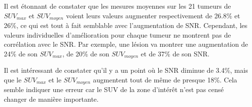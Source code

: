 Il est étonnant de constater que les mesures moyennes sur les 21 tumeurs de $SUV_{max}$ et $SUV_{moyen}$ voient leurs valeurs augmenter respectivement de 26.8\% et 26\%, ce qui est tout à fait semblable avec l'augmentation de SNR. Cependant, les valeurs individuelles d'amélioration  pour chaque tumeur ne montrent pas de corrélation avec le SNR. Par exemple, une lésion va montrer une augmentation de 24\% de son $SUV_{max}$, de 20\% de son $SUV_{moyen}$ et de 37\% de son SNR.

Il est intéressant de constater qu'il y a un point où le SNR diminue de 3.4\%, mais que le $SUV_{max}$ et le $SUV_{moyen}$ augmentent tout de même de presque 18\%. Cela semble indiquer une erreur car le SUV de la zone d'intérêt n'est pas censé changer de manière importante.
